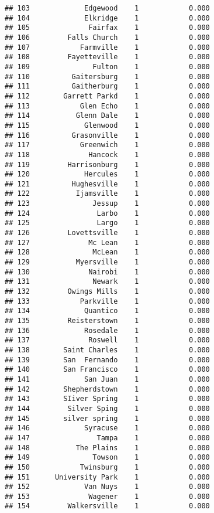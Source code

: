 \documentclass[]{article}
\begin{document}
\begin{verbatim}
## 103             Edgewood    1            0.000
## 104             Elkridge    1            0.000
## 105              Fairfax    1            0.000
## 106         Falls Church    1            0.000
## 107            Farmville    1            0.000
## 108         Fayetteville    1            0.000
## 109               Fulton    1            0.000
## 110          Gaitersburg    1            0.000
## 111          Gaitherburg    1            0.000
## 112        Garrett Parkd    1            0.000
## 113            Glen Echo    1            0.000
## 114           Glenn Dale    1            0.000
## 115             Glenwood    1            0.000
## 116          Grasonville    1            0.000
## 117            Greenwich    1            0.000
## 118              Hancock    1            0.000
## 119         Harrisonburg    1            0.000
## 120             Hercules    1            0.000
## 121          Hughesville    1            0.000
## 122           Ijamsville    1            0.000
## 123               Jessup    1            0.000
## 124                Larbo    1            0.000
## 125                Largo    1            0.000
## 126         Lovettsville    1            0.000
## 127              Mc Lean    1            0.000
## 128               McLean    1            0.000
## 129           Myersville    1            0.000
## 130              Nairobi    1            0.000
## 131               Newark    1            0.000
## 132         Owings Mills    1            0.000
## 133            Parkville    1            0.000
## 134             Quantico    1            0.000
## 135         Reisterstown    1            0.000
## 136             Rosedale    1            0.000
## 137              Roswell    1            0.000
## 138        Saint Charles    1            0.000
## 139        San  Fernando    1            0.000
## 140        San Francisco    1            0.000
## 141             San Juan    1            0.000
## 142        Shepherdstown    1            0.000
## 143        SIiver Spring    1            0.000
## 144         Silver Sping    1            0.000
## 145        silver spring    1            0.000
## 146             Syracuse    1            0.000
## 147                Tampa    1            0.000
## 148           The Plains    1            0.000
## 149               Towson    1            0.000
## 150            Twinsburg    1            0.000
## 151      University Park    1            0.000
## 152             Van Nuys    1            0.000
## 153              Wagener    1            0.000
## 154         Walkersville    1            0.000

\end{verbatim}
\end{document}
